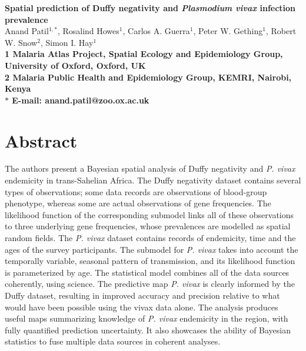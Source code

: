 \documentclass[10pt]{article}
\date{}
\begin{document}
\garamond

\begin{flushleft}
{\Large
\textbf{Spatial prediction of Duffy negativity and \emph{Plasmodium vivax} infection prevalence}
}
\\
Anand Patil$^{1,\ast}$,  
Rosalind Howes$^{1}$,
Carlos A. Guerra$^1$,
Peter W. Gething$^{1}$,
Robert W. Snow$^2$,
Simon I. Hay$^1$
\\
\bf{1} Malaria Atlas Project, Spatial Ecology and Epidemiology Group, University of Oxford, Oxford, UK
\\
\bf{2} Malaria Public Health and Epidemiology Group, KEMRI, Nairobi, Kenya
\\
$\ast$ E-mail: anand.patil@zoo.ox.ac.uk
\end{flushleft}

\section*{Abstract}

The authors present a Bayesian spatial analysis of Duffy negativity and \emph{P. vivax} endemicity in trans-Sahelian Africa. The Duffy negativity dataset contains several types of observations; some data records are observations of blood-group phenotype, whereas some are actual observations of gene frequencies. The likelihood function of the corresponding submodel links all of these observations to three underlying gene frequencies, whose prevalences are modelled as spatial random fields. The \emph{P. vivax} dataset contains records of endemicity, time and the ages of the survey participants. The submodel for \emph{P. vivax} takes into account the temporally variable, seasonal pattern of transmission, and its likelihood function is parameterized by age. The statistical model combines all of the data sources coherently, using science. The predictive map \emph{P. vivax} is clearly informed by the Duffy dataset, resulting in improved accuracy and precision relative to what would have been possible using the vivax data alone. The analysis produces useful maps summarizing knowledge of \emph{P. vivax} endemicity in the region, with fully quantified prediction uncertainty. It also showcases the ability of Bayesian statistics to fuse multiple data sources in coherent analyses.
\end{document}
